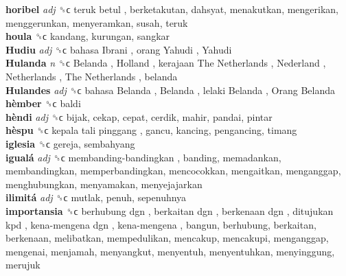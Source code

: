 \textbf{horibel} \emph{adj}  ␝ϲ   teruk betul , berketakutan, dahsyat, menakutkan, mengerikan, menggerunkan, menyeramkan, susah, teruk  \\
\textbf{houla} ␝ϲ  kandang, kurungan, sangkar  \\
\textbf{Hudiu} \emph{adj}  ␝ϲ   bahasa Ibrani ,  orang Yahudi ,  Yahudi   \\
\textbf{Hulanda} \emph{n}  ␝ϲ   Belanda ,  Holland ,  kerajaan The Netherlands ,  Nederland ,  Netherlands ,  The Netherlands , belanda  \\
\textbf{Hulandes} \emph{adj}  ␝ϲ   bahasa Belanda ,  Belanda ,  lelaki Belanda ,  Orang Belanda   \\
\textbf{hèmber} ␝ϲ  baldi  \\
\textbf{hèndi} \emph{adj}  ␝ϲ  bijak, cekap, cepat, cerdik, mahir, pandai, pintar  \\
\textbf{hèspu} ␝ϲ   kepala tali pinggang , gancu, kancing, pengancing, timang  \\
\textbf{iglesia} ␝ϲ  gereja, sembahyang  \\
\textbf{igualá} \emph{adj}  ␝ϲ   membanding-bandingkan , banding, memadankan, membandingkan, memperbandingkan, mencocokkan, mengaitkan, menganggap, menghubungkan, menyamakan, menyejajarkan  \\
\textbf{ilimitá} \emph{adj}  ␝ϲ  mutlak, penuh, sepenuhnya  \\
\textbf{importansia} ␝ϲ   berhubung dgn ,  berkaitan dgn ,  berkenaan dgn ,  ditujukan kpd ,  kena-mengena dgn ,  kena-mengena , bangun, berhubung, berkaitan, berkenaan, melibatkan, mempedulikan, mencakup, mencakupi, menganggap, mengenai, menjamah, menyangkut, menyentuh, menyentuhkan, menyinggung, merujuk  \\
